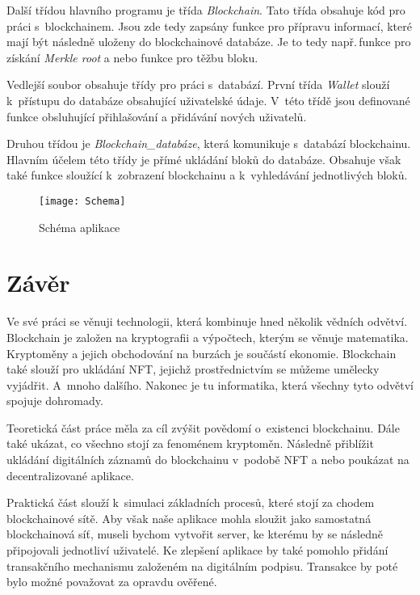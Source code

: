\documentclass[12pt]{report}			%
\begin{document}
{{Další třídou hlavního programu je třída \textit{Blockchain}. Tato třída obsahuje kód pro práci s~blockchainem. Jsou zde tedy zapsány funkce pro přípravu informací, které mají být následně uloženy do blockchainové databáze. Je to tedy např.\,funkce pro získání \textit{Merkle root} a nebo funkce pro těžbu bloku.

Vedlejší soubor obsahuje třídy pro práci s~databází. První třída \textit{Wallet} slouží k~přístupu do databáze obsahující uživatelské údaje. V~této třídě jsou definované funkce obsluhující přihlašování a přidávání nových uživatelů. 

Druhou třídou je \textit{Blockchain\_databáze}, která komunikuje s~databází blockchainu. Hlavním účelem této třídy je přímé ukládání bloků do databáze. Obsahuje však také funkce sloužící k~zobrazení blockchainu a k~vyhledávání jednotlivých bloků.
}
\begin{figure}[h]
\caption{Schéma aplikace}
\texttt{[image: Schema]}	
\centering
\label{Pridavani_bloku}
\end{figure}
	\chapter*{Závěr}{
Ve své práci se věnuji technologii, která kombinuje hned několik vědních odvětví. Blockchain je založen na kryptografii a výpočtech, kterým se věnuje matematika. Kryptoměny a jejich obchodování na burzách je součástí ekonomie. Blockchain také slouží pro ukládání NFT, jejichž prostřednictvím se můžeme umělecky vyjádřit. A~mnoho dalšího. Nakonec je tu informatika, která všechny tyto odvětví spojuje dohromady.

Teoretická část práce měla za cíl zvýšit povědomí o~existenci blockchainu. Dále také ukázat, co všechno stojí za fenoménem kryptoměn. Následně přiblížit ukládání digitálních záznamů do blockchainu v~podobě NFT a nebo poukázat na decentralizované aplikace.

Praktická část slouží k~simulaci základních procesů, které stojí za chodem blockchainové sítě. Aby však naše aplikace mohla sloužit jako samostatná blockchainová síť, museli bychom vytvořit server, ke kterému by se následně připojovali jednotliví uživatelé. Ke zlepšení aplikace by také pomohlo přidání transakčního mechanismu založeném na digitálním podpisu. Transakce by poté bylo možné považovat za opravdu ověřené.
	}	
	\nocite{*}
    \printbibliography					%
    \listoffigures					
	\begin{appendices}

\end{appendices}}
\end{document}
